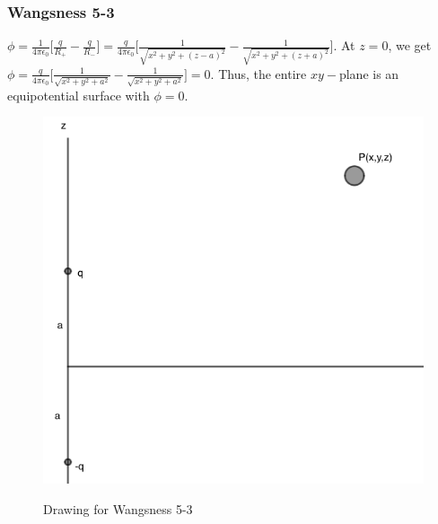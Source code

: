 \documentclass[oneside]{book}
\theoremstyle{mystyle}
\begin{document}
\subsubsection{Wangsness 5-3}
$\phi = \frac{1}{4\pi \epsilon_0}\big[ \frac{q}{R_{+}} - \frac{q}{R_{-}}\big] = \frac{q}{4\pi \epsilon_0}\big[\frac{1}{\sqrt{x^2+y^2+(z-a)^2}}-\frac{1}{\sqrt{x^2+y^2+(z+a)^2}}\big]$. At $z=0$, we get $\phi = \frac{q}{4\pi \epsilon_0}\big[ \frac{1}{\sqrt{x^2+y^2+a^2}}-\frac{1}{\sqrt{x^2+y^2+a^2}}\big] = 0$. Thus, the entire $xy-$plane is an equipotential surface with $\phi = 0$.
\begin{figure}[htbp]
  \centering
    {\includegraphics[scale=0.4]{5-3.png}}
    \caption{Drawing for Wangsness 5-3}
\end{figure}
\end{document}
